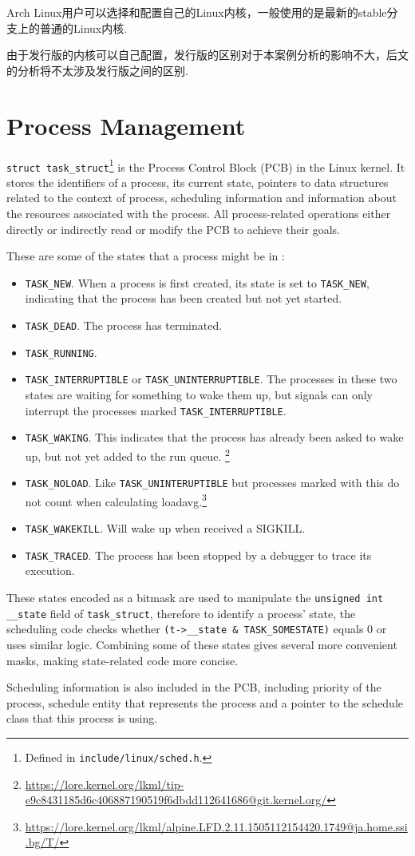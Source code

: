 \documentclass[11pt]{article}
\begin{document}
Arch Linux用户可以选择和配置自己的Linux内核，一般使用的是最新的stable分支上的普通的Linux内核.
\begin{notebox}
	由于发行版的内核可以自己配置，发行版的区别对于本案例分析的影响不大，后文的分析将不太涉及发行版之间的区别.
\end{notebox}



\section{Process Management}
\lstinline{struct task_struct}\footnote{Defined in \lstinline{include/linux/sched.h}.\label{sched.h}} is the Process Control Block (PCB) in the Linux kernel.
It stores the identifiers of a process, its current state, pointers to data structures related to the context of process, scheduling information and information about the resources associated with the process.
All process-related operations either directly or indirectly read or modify the PCB to achieve their goals.

These are some of the states that a process might be in :
\begin{itemize}
	\item \lstinline{TASK_NEW}.
	      When a process is first created, its state is set to \lstinline{TASK_NEW}, indicating that the process has been created but not yet started.
	\item \lstinline{TASK_DEAD}.
	      The process has terminated.
	\item \lstinline{TASK_RUNNING}.
	\item \lstinline{TASK_INTERRUPTIBLE} or \lstinline{TASK_UNINTERRUPTIBLE}.
	      The processes in these two states are waiting for something to wake them up, but signals can only interrupt the processes marked \lstinline{TASK_INTERRUPTIBLE}.
	\item \lstinline{TASK_WAKING}.
	      This indicates that the process has already been asked to wake up, but not yet added to the run queue. \footnote{\url{https://lore.kernel.org/lkml/tip-e9c8431185d6c406887190519f6dbdd112641686@git.kernel.org/}}
	\item \lstinline{TASK_NOLOAD}.
	      Like \lstinline{TASK_UNINTERUPTIBLE} but processes marked with this do not count when calculating loadavg.\footnote{\url{https://lore.kernel.org/lkml/alpine.LFD.2.11.1505112154420.1749@ja.home.ssi.bg/T/}}
	\item \lstinline{TASK_WAKEKILL}.
	      Will wake up when received a SIGKILL.
	\item \lstinline{TASK_TRACED}.
	      The process has been stopped by a debugger to trace its execution.
\end{itemize}
These states encoded as a bitmask are used to manipulate the \lstinline{unsigned int __state} field of \lstinline{task_struct}, therefore to identify a process' state, the scheduling code checks whether \lstinline{(t->__state & TASK_SOMESTATE)} equals 0 or uses similar logic.
Combining some of these states gives several more convenient masks, making state-related code more concise.

Scheduling information is also included in the PCB, including priority of the process, schedule entity that represents the process and a pointer to the schedule class that this process is using.

\printbibliography[heading=bibintoc]

\newpage
\end{document}
